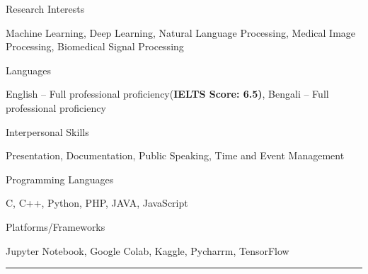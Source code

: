 \documentclass[a4paper,10pt]{article}
\newlength{\cvcolumngapwidth}
\newlength{\cvleftcolumnwidth}
\newlength{\cvrightcolumnwidth}
\newcommand{\cvsectionstyle}[1]{{\normalsize\cvsectionfont\textcolor{cvsectioncolor}{#1}}}
\newcommand{\cvdurationstyle}[1]{{\small\cvdurationfont\textcolor{cvdurationcolor}{#1}}}
\newcommand{\cvheadingstyle}[1]{{\normalsize\cvheadingfont\textcolor{cvheadingcolor}{#1}}}
\newlength{\cvafteritemskipamount}
\newlength{\cvaftersectionskipamount}
\newlength{\cvbetweensectionandheadingextraskipamount}
\newlength{\cvparskip}
\newcommand{\cvsection}[1]{
    \begin{minipage}[t]{\cvleftcolumnwidth}
        \raggedleft\cvsectionstyle{#1}
    \end{minipage}%
    \hspace{\cvcolumngapwidth}%
    \begin{minipage}[t]{\cvrightcolumnwidth}
        \textcolor{cvrulecolor}{\rule{\cvrightcolumnwidth}{0.3mm}}
    \end{minipage}

    \vspace{\cvaftersectionskipamount}
}
\newcommand{\cvitem}[2]{
    \begin{minipage}[t]{\cvleftcolumnwidth}
        \raggedleft #1
    \end{minipage}%
    \hspace{\cvcolumngapwidth}%
    \begin{minipage}[t]{\cvrightcolumnwidth}
        \setlength{\parskip}{\cvparskip} #2
    \end{minipage}

    \vspace{\cvafteritemskipamount}
}
\begin{document}
\cvitem{
    \cvheadingstyle{Research Interests}
}{
   Machine Learning, Deep Learning, Natural Language Processing, Medical Image Processing, Biomedical Signal Processing
}

\cvitem{
    \cvheadingstyle{Languages}
}{
    English -- Full professional proficiency(\textbf{IELTS Score: 6.5)}, Bengali -- Full professional proficiency
}

\cvitem{
    \cvheadingstyle{Interpersonal Skills}
}{
    Presentation, Documentation, Public Speaking, Time and Event Management
}

\cvitem{
    \cvheadingstyle{Programming Languages}
}{
    C, C++, Python,  PHP, JAVA, JavaScript
}
\cvitem{
    \cvheadingstyle{Platforms/Frameworks}
}{
    Jupyter Notebook, Google Colab, Kaggle, Pycharrm, TensorFlow
}
\cvsection{PUBLICATIONS}

\end{document}
